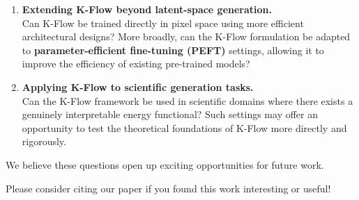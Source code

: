 \begin{enumerate}
\def\labelenumi{\arabic{enumi}.}
\item
  \textbf{Extending K-Flow beyond latent-space generation.}\\
  Can K-Flow be trained directly in pixel space using more efficient architectural designs? More broadly, can the K-Flow formulation be adapted to \textbf{parameter-efficient fine-tuning (PEFT)} settings, allowing it to improve the efficiency of existing pre-trained models?
\item
  \textbf{Applying K-Flow to scientific generation tasks.}\\
  Can the K-Flow framework be used in scientific domains where there exists a genuinely interpretable energy functional? Such settings may offer an opportunity to test the theoretical foundations of K-Flow more directly and rigorously.
\end{enumerate}

We believe these questions open up exciting opportunities for future work.

Please consider citing our paper if you found this work interesting or useful!

